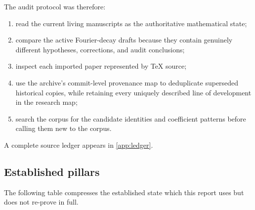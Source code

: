 \documentclass[11pt,oneside]{article}
\numberwithin{equation}{section}
\theoremstyle{definition}
\theoremstyle{remark}
\begin{document}
The audit protocol was therefore:
\begin{enumerate}
\item read the current living manuscripts as the authoritative mathematical state;
\item compare the active Fourier-decay drafts because they contain genuinely different
      hypotheses, corrections, and audit conclusions;
\item inspect each imported paper represented by TeX source;
\item use the archive's commit-level provenance map to deduplicate superseded historical
      copies, while retaining every uniquely described line of development in the research map;
\item search the corpus for the candidate identities and coefficient patterns before calling
      them new to the corpus.
\end{enumerate}
A complete source ledger appears in \cref{app:ledger}.

\subsection{Established pillars}

The following table compresses the established state which this report uses but does not
re-prove in full.
\end{document}

